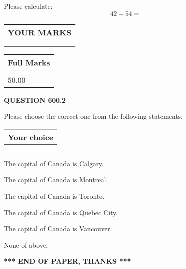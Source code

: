 \documentclass[12pt]{article}
\begin{document}
  
 
Please calculate:
\begin{equation}
42 +  %
54 = \nonumber
\end{equation}
 

 

 
  
\vspace{0.2in}
  
\noindent\begin{tabular}{|l|}
\hline
 YOUR MARKS  \\
\hline
 \\ 
 \\ 
\hline
\end{tabular}
\hspace{0.05in} \begin{tabular}{|l|}
\hline
 Full Marks  \\
\hline
 \\ 
50.00 \\
\hline
\end{tabular}
{\textbf{\Large{QUESTION
600.2 
}}}
  
  
Please choose the correct one from the following statements.
  
  
\noindent\hspace{3.0in} \begin{tabular}{|l|}
\hline
Your choice \\
\hline
 \\ 
 \\ 
\hline
\end{tabular}
  
  
 
 
The capital of Canada is Calgary.
 
 
The capital of Canada is Montreal.
 
 
The capital of Canada is Toronto.
 
 
The capital of Canada is Quebec City.
 
 
The capital of Canada is Vancouver.
 
 
 None of above.
 
 
   
   
 \vspace{0.2in}
 
   
   
   
   
\vspace{1.0in} 
{\textbf{\large{ *** END OF PAPER, THANKS *** }}} 
   
\end{document}
